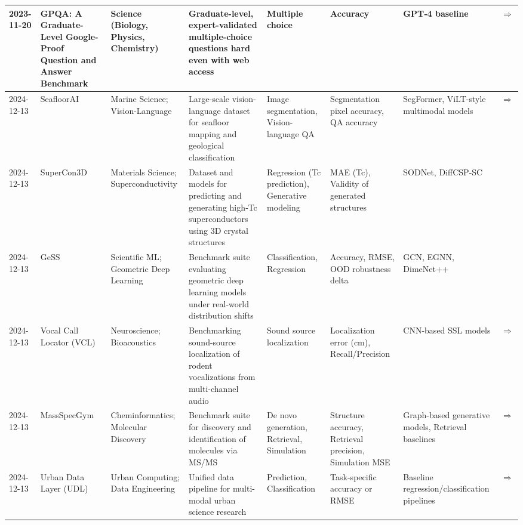 \documentclass{article}
\begin{document}
\begin{landscape}
{\begin{longtable}{|p{1.5cm}|p{2.5cm}|p{2cm}|p{2cm}|p{3cm}|p{2cm}|p{2cm}|p{1cm}|}
2023-11-20 & GPQA: A Graduate-Level Google-Proof Question and Answer Benchmark & Science (Biology, Physics, Chemistry) & Graduate-level, expert-validated multiple-choice questions hard even with web access & Multiple choice & Accuracy & GPT‑4 baseline & \cite{rein2023gpqa} \href{https://arxiv.org/abs/2311.12022}{$\Rightarrow$ } \\ \hline
2024-12-13 & SeafloorAI & Marine Science; Vision-Language & Large-scale vision-language dataset for seafloor mapping and geological classification & Image segmentation, Vision-language QA & Segmentation pixel accuracy, QA accuracy & SegFormer, ViLT-style multimodal models & \cite{nguyen2024seafloorai} \href{https://arxiv.org/abs/2411.00172}{$\Rightarrow$ } \\ \hline
2024-12-13 & SuperCon3D & Materials Science; Superconductivity & Dataset and models for predicting and generating high‑Tc superconductors using 3D crystal structures & Regression (Tc prediction), Generative modeling & MAE (Tc), Validity of generated structures & SODNet, DiffCSP‑SC & \cite{zhuang2024supercon3d} \\ \hline
2024-12-13 & GeSS & Scientific ML; Geometric Deep Learning & Benchmark suite evaluating geometric deep learning models under real-world distribution shifts & Classification, Regression & Accuracy, RMSE, OOD robustness delta & GCN, EGNN, DimeNet++ & \cite{zou2024gess} \\ \hline
2024-12-13 & Vocal Call Locator (VCL) & Neuroscience; Bioacoustics & Benchmarking sound-source localization of rodent vocalizations from multi-channel audio & Sound source localization & Localization error (cm), Recall/Precision & CNN-based SSL models & \cite{peterson2024vcl} \href{https://neurips.cc/virtual/2024/poster/97470}{$\Rightarrow$ } \\ \hline
2024-12-13 & MassSpecGym & Cheminformatics; Molecular Discovery & Benchmark suite for discovery and identification of molecules via MS/MS & De novo generation, Retrieval, Simulation & Structure accuracy, Retrieval precision, Simulation MSE & Graph-based generative models, Retrieval baselines & \cite{bushuiev2024massspecgym} \href{https://neurips.cc/virtual/2024/poster/97823}{$\Rightarrow$ } \\ \hline
2024-12-13 & Urban Data Layer (UDL) & Urban Computing; Data Engineering & Unified data pipeline for multi-modal urban science research & Prediction, Classification & Task-specific accuracy or RMSE & Baseline regression/classification pipelines & \cite{wang2024urbandatalayer} \href{https://neurips.cc/virtual/2024/poster/97837}{$\Rightarrow$ } \\ \hline

\end{longtable}}
\end{landscape}
\end{document}

